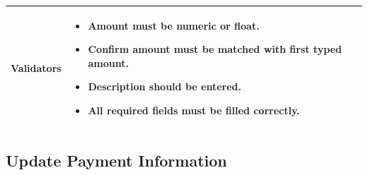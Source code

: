 \documentclass[12pt,a4paper]{article}
\begin{document}
\begin{longtable}{| p{3cm}|p{12cm}|}
Validators & 
\begin{itemize}
\item  Amount must be numeric or float.
\item Confirm amount must be matched with first typed amount.
\item Description should be entered.
\item All required fields must be filled correctly. 

\end{itemize}
\\ \hline

\end{longtable} 
\subsection{Update Payment Information}
\end{document}
